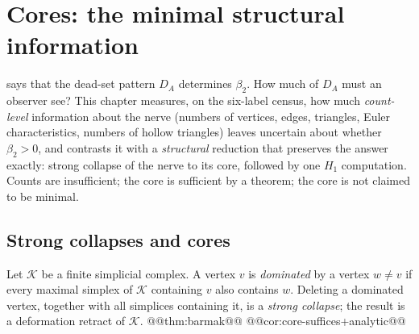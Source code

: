 \chapter{Cores: the minimal structural information}\label{ch:minimal}

 says that the dead-set pattern $D_A$ determines $\beta_2$. How much of $D_A$ must an observer see? This chapter measures, on the six-label census, how much \emph{count-level} information about the nerve (numbers of vertices, edges, triangles, Euler characteristics, numbers of hollow triangles) leaves uncertain about whether $\beta_2>0$, and contrasts it with a \emph{structural} reduction that preserves the answer exactly: strong collapse of the nerve to its core, followed by one $H_1$ computation. Counts are insufficient; the core is sufficient by a theorem; the core is not claimed to be minimal.

\section{Strong collapses and cores}
Let $\mathcal K$ be a finite simplicial complex. A vertex $v$ is \emph{dominated} by a vertex $w\neq v$ if every maximal simplex of $\mathcal K$ containing $v$ also contains $w$. Deleting a dominated vertex, together with all simplices containing it, is a \emph{strong collapse}; the result is a deformation retract of $\mathcal K$.
@@thm:barmak@@
@@cor:core-suffices+analytic@@

